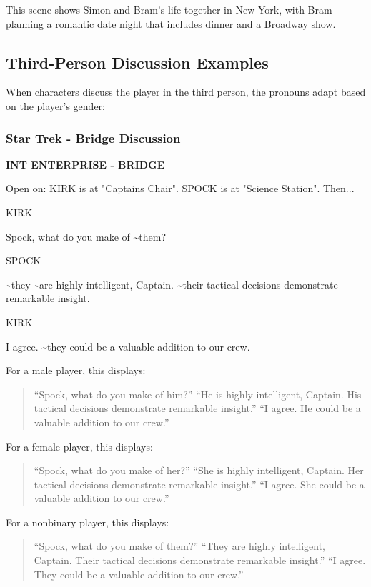\documentclass[11pt,letterpaper,oldstylefigures]{memoir}
\newcommand{\slugline}[1]{\nobreak\textbf{\MakeUppercase{#1}}\par\nobreak\vspace{1\baselineskip}}
\newcommand{\speaker}[1]{\nobreak\hspace*{0.333\textwidth}\MakeUppercase{#1}\par\nobreak\vspace{0.5\baselineskip}}
\newcommand{\dialogue}[1]{\nobreak\hspace*{0.25\textwidth}\begin{minipage}{0.5\textwidth}#1\end{minipage}\par\vspace{1\baselineskip}}
\newcommand{\stagedir}[1]{#1\par\vspace{1\baselineskip}}
\newenvironment{FountainExample}
  {\begingroup
  \ttfamily\small
   \setlength{\parindent}{0pt}
  \setlength{\parskip}{0.5em}
  \allowdisplaybreaks
  \setlength{\displaywidowpenalty}{0}
  \setlength{\widowpenalty}{0}
  \setlength{\clubpenalty}{0}
  \setlength{\interlinepenalty}{0}
}
  {\endgroup}
\begin{document}
This scene shows Simon and Bram's life together in New York, with Bram planning a romantic date night that includes dinner and a Broadway show.

\subsection{Third-Person Discussion Examples}

When characters discuss the player in the third person, the pronouns adapt based on the player's gender:
\subsubsection*{Star Trek - Bridge Discussion}
\label{ex:star-trek-bridge-discussion}

\begin{FountainExample}
\slugline{INT ENTERPRISE - BRIDGE}

\stagedir{Open on: KIRK is at "Captains Chair". SPOCK is at "Science Station". Then...}

\speaker{KIRK}
\dialogue{Spock, what do you make of \textasciitilde{}them?}

\speaker{SPOCK}
\dialogue{\textasciitilde{}they \textasciitilde{}are highly intelligent, Captain. \textasciitilde{}their tactical decisions demonstrate remarkable insight.}

\speaker{KIRK}
\dialogue{I agree. \textasciitilde{}they could be a valuable addition to our crew.}
\end{FountainExample}

For a male player, this displays:
\begin{quote}
``Spock, what do you make of him?''
``He is highly intelligent, Captain. His tactical decisions demonstrate remarkable insight.''
``I agree. He could be a valuable addition to our crew.''
\end{quote}

For a female player, this displays:
\begin{quote}
``Spock, what do you make of her?''
``She is highly intelligent, Captain. Her tactical decisions demonstrate remarkable insight.''
``I agree. She could be a valuable addition to our crew.''
\end{quote}

For a nonbinary player, this displays:
\begin{quote}
``Spock, what do you make of them?''
``They are highly intelligent, Captain. Their tactical decisions demonstrate remarkable insight.''
``I agree. They could be a valuable addition to our crew.''
\end{quote}
\end{document}

